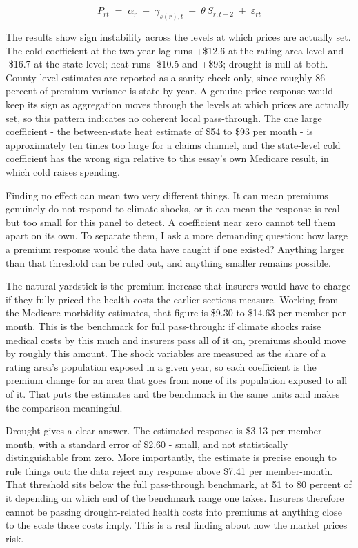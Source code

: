 \documentclass[a4paper,11pt]{report}
\begin{document}
\begin{equation}
P_{rt} \;=\; \alpha_r \;+\; \gamma_{s(r),t} \;+\; \theta \, \bar{S}_{r,t-2} \;+\; \varepsilon_{rt}
\label{eq:passthrough}
\end{equation}

The results show sign instability across the levels at which prices are actually set. The cold coefficient at the two-year lag runs +\$12.6 at the rating-area level and -\$16.7 at the state level; heat runs -\$10.5 and +\$93; drought is null at both. County-level estimates are reported as a sanity check only, since roughly 86 percent of premium variance is state-by-year. A genuine price response would keep its sign as aggregation moves through the levels at which prices are actually set, so this pattern indicates no coherent local pass-through. The one large coefficient - the between-state heat estimate of \$54 to \$93 per month - is approximately ten times too large for a claims channel, and the state-level cold coefficient has the wrong sign relative to this essay's own Medicare result, in which cold raises spending.

Finding no effect can mean two very different things. It can mean premiums genuinely do not respond to climate shocks, or it can mean the response is real but too small for this panel to detect. A coefficient near zero cannot tell them apart on its own. To separate them, I ask a more demanding question: how large a premium response would the data have caught if one existed? Anything larger than that threshold can be ruled out, and anything smaller remains possible.

The natural yardstick is the premium increase that insurers would have to charge if they fully priced the health costs the earlier sections measure. Working from the Medicare morbidity estimates, that figure is \$9.30 to \$14.63 per member per month. This is the benchmark for full pass-through: if climate shocks raise medical costs by this much and insurers pass all of it on, premiums should move by roughly this amount. The shock variables are measured as the share of a rating area's population exposed in a given year, so each coefficient is the premium change for an area that goes from none of its population exposed to all of it. That puts the estimates and the benchmark in the same units and makes the comparison meaningful.

Drought gives a clear answer. The estimated response is \$3.13 per member-month, with a standard error of \$2.60 - small, and not statistically distinguishable from zero. More importantly, the estimate is precise enough to rule things out: the data reject any response above \$7.41 per member-month. That threshold sits below the full pass-through benchmark, at 51 to 80 percent of it depending on which end of the benchmark range one takes. Insurers therefore cannot be passing drought-related health costs into premiums at anything close to the scale those costs imply. This is a real finding about how the market prices risk.
\end{document}
